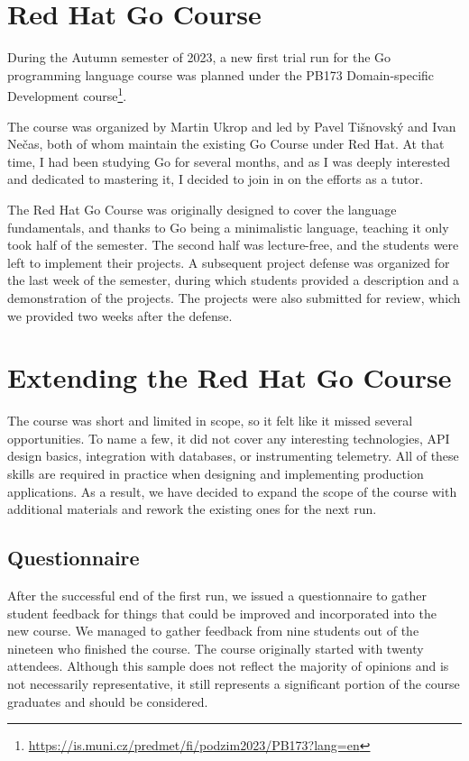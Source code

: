 \documentclass[
  digital,
  color,
  oneside,
  nosansbold,
  nocolorbold,
  nolof,
  nolot,
]{fithesis4}
\begin{document}
\section{Red Hat Go Course}

During the Autumn semester of 2023, a new first trial run for the Go programming language course was planned under the PB173 Domain-specific Development course\footnote{ \url{https://is.muni.cz/predmet/fi/podzim2023/PB173?lang=en}}.

The course was organized by Martin Ukrop and led by Pavel Tišnovský and Ivan Nečas, both of whom maintain the existing Go Course \cite{redhat-go-course} under Red Hat. At that time, I had been studying Go for several months, and as I was deeply interested and dedicated to mastering it, I decided to join in on the efforts as a tutor.

The Red Hat Go Course was originally designed to cover the language fundamentals, and thanks to Go being a minimalistic language, teaching it only took half of the semester. The second half was lecture-free, and the students were left to implement their projects. A subsequent project defense was organized for the last week of the semester, during which students provided a description and a demonstration of the projects. The projects were also submitted for review, which we provided two weeks after the defense.

\section{Extending the Red Hat Go Course}

The course was short and limited in scope, so it felt like it missed several opportunities. To name a few, it did not cover any interesting technologies, API design basics, integration with databases, or instrumenting telemetry. All of these skills are required in practice when designing and implementing production applications. As a result, we have decided to expand the scope of the course with additional materials and rework the existing ones for the next run.

\subsection{Questionnaire}

After the successful end of the first run, we issued a questionnaire to gather student feedback for things that could be improved and incorporated into the new course. We managed to gather feedback from nine students out of the nineteen who finished the course. The course originally started with twenty attendees. Although this sample does not reflect the majority of opinions and is not necessarily representative, it still represents a significant portion of the course graduates and should be considered.
\end{document}
